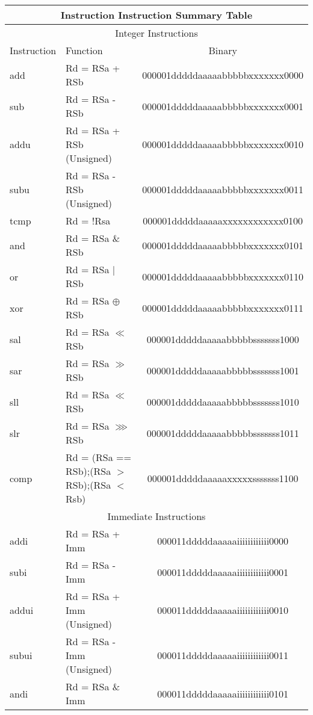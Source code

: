 \documentclass[letterpaper, 11pt]{article}
\begin{document}
	\begin{center}
		\begin{longtable}{|l|l|c|}
			\multicolumn{3}{c}{Instruction Instruction Summary Table} \\ \hline
			\multicolumn{3}{|c|}{Integer Instructions} \\ \hline
			Instruction & Function 										& Binary \\ \hline
			add			& Rd = RSa + RSb 								& 000001dddddaaaaabbbbbxxxxxxx0000 \\
			sub			& Rd = RSa - RSb 								& 000001dddddaaaaabbbbbxxxxxxx0001 \\
			addu		& Rd = RSa + RSb (Unsigned) 					& 000001dddddaaaaabbbbbxxxxxxx0010 \\
			subu		& Rd = RSa - RSb (Unsigned)					 	& 000001dddddaaaaabbbbbxxxxxxx0011 \\
			tcmp		& Rd = !Rsa	 									& 000001dddddaaaaaxxxxxxxxxxxx0100 \\
			and			& Rd = RSa \& RSb								& 000001dddddaaaaabbbbbxxxxxxx0101 \\
			or			& Rd = RSa $|$ RSb 								& 000001dddddaaaaabbbbbxxxxxxx0110 \\
			xor			& Rd = RSa $\oplus$ RSb 						& 000001dddddaaaaabbbbbxxxxxxx0111 \\
			sal			& Rd = RSa $\ll$ RSb 							& 000001dddddaaaaabbbbbsssssss1000 \\
			sar			& Rd = RSa $\gg$ RSb 							& 000001dddddaaaaabbbbbsssssss1001 \\
			sll			& Rd = RSa $\ll$ RSb 							& 000001dddddaaaaabbbbbsssssss1010 \\
			slr			& Rd = RSa $ \ggg  $ RSb 						& 000001dddddaaaaabbbbbsssssss1011 \\
			comp		& Rd = (RSa == RSb);(RSa $>$ RSb);(RSa $<$ Rsb)	& 000001dddddaaaaaxxxxxsssssss1100 \\
			\hline
			\multicolumn{3}{|c|}{Immediate Instructions} \\ \hline
			addi		& Rd = RSa + Imm 								& 000011dddddaaaaaiiiiiiiiiiii0000 \\
			subi		& Rd = RSa - Imm 								& 000011dddddaaaaaiiiiiiiiiiii0001 \\
			addui		& Rd = RSa + Imm (Unsigned)						& 000011dddddaaaaaiiiiiiiiiiii0010 \\
			subui		& Rd = RSa - Imm (Unsigned)					 	& 000011dddddaaaaaiiiiiiiiiiii0011 \\
			andi		& Rd = RSa \& Imm								& 000011dddddaaaaaiiiiiiiiiiii0101 \\

\end{longtable}
\end{center}
\end{document}
